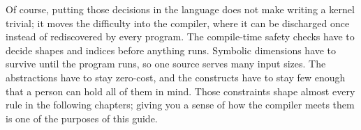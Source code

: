 Of course, putting those decisions in the language does not make writing a kernel trivial; it moves the difficulty into the compiler, where it can be discharged once instead of rediscovered by every program. The compile-time safety checks have to decide shapes and indices before anything runs. Symbolic dimensions have to survive until the program runs, so one source serves many input sizes. The abstractions have to stay zero-cost, and the constructs have to stay few enough that a person can hold all of them in mind. Those constraints shape almost every rule in the following chapters; giving you a sense of how the compiler meets them is one of the purposes of this guide.
